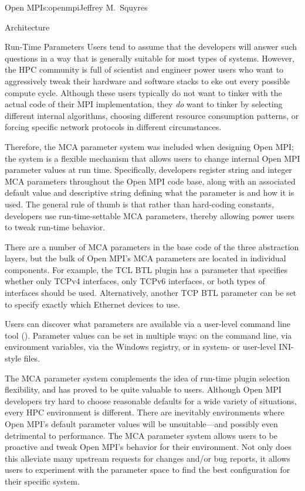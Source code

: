 \begin{aosachapter}{Open MPI}{s:openmpi}{Jeffrey M.\ Squyres}
\begin{aosasect1}{Architecture}
\begin{aosasect2}{Run-Time Parameters}
Users tend to assume that the developers will answer such questions in
a way that is generally suitable for most types of systems.
%
However, the HPC community is full of scientist and engineer power
users who want to aggressively tweak their hardware and software
stacks to eke out every possible compute cycle.
%
Although these users typically do not want to tinker with the actual
code of their MPI implementation, they \emph{do} want to tinker by
selecting different internal algorithms, choosing different resource
consumption patterns, or forcing specific network protocols in
different circumstances.

Therefore, the MCA parameter system was included when designing Open
MPI; the system is a flexible mechanism that allows users to change internal Open
MPI parameter values at run time.
%
Specifically, developers register string and integer MCA parameters
throughout the Open MPI code base, along with an associated default
value and descriptive string defining what the parameter is and how it
is used.
%
The general rule of thumb is that rather than hard-coding constants,
developers use run-time-settable MCA parameters, thereby allowing
power users to tweak run-time behavior.

There are a number of MCA parameters in the base code of the three
abstraction layers, but the bulk of Open MPI's MCA parameters are
located in individual components.
%
For example, the TCL BTL plugin has a parameter that specifies whether
only TCPv4 interfaces, only TCPv6 interfaces, or both types of
interfaces should be used.
%
Alternatively, another TCP BTL parameter can be set to specify
exactly which Ethernet devices to use.

Users can discover what parameters are available via a user-level
command line tool ().
%
Parameter values can be set in multiple ways: on the command line, via
environment variables, via the Windows registry, or in system- or
user-level INI-style files.

The MCA parameter system complements the idea of run-time plugin
selection flexibility, and has proved to be quite valuable to users.
%
Although Open MPI developers try hard to choose reasonable defaults
for a wide variety of situations, every HPC environment is different.
There are inevitably environments where Open MPI's default parameter
values will be unsuitable---and possibly even detrimental to
performance.
%
The MCA parameter system allows users to be proactive and tweak Open
MPI's behavior for their environment.  Not only does this alleviate
many upstream requests for changes and/or bug reports, it allows users
to experiment with the parameter space to find the best configuration
for their specific system.


\end{aosasect2}
\end{aosasect1}
\end{aosachapter}
